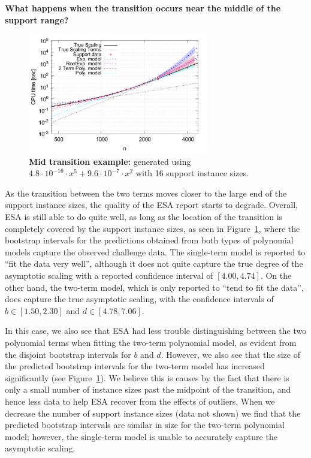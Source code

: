 \documentclass[aic]{iosart2x}
\begin{document}
\textbf{What happens when the transition occurs near the middle of the support range?}
\begin{figure}[t]
\centering
\includegraphics[width=0.7\textwidth]{fittedModels-2-5-15-16s.pdf}
\caption{\textbf{Mid transition example:} generated using $4.8\cdot 10^{-16} \cdot x^5 + 9.6\cdot 10^{-7} \cdot x^2$ with 16 support instance sizes.}
\label{fig:AA-competing-2-5-15-16s}
\end{figure}
As the transition between the two terms moves closer to the large end of the support instance sizes, the quality of the ESA report starts to degrade. Overall, ESA is still able to do quite well, as long as the location of the transition is completely covered by the support instance sizes, as seen in Figure~\ref{fig:AA-competing-2-5-15-16s}, where the bootstrap intervals for the predictions obtained from both types of polynomial models capture the observed challenge data. 
The single-term model is reported to ``fit the data very well'', although it does not quite capture the true degree of the asymptotic scaling with a reported confidence interval of $[4.00,4.74]$. 
On the other hand, the two-term model, which is only reported to ``tend to fit the data'', does capture the true asymptotic scaling, with the confidence intervals of $b \in [1.50,2.30]$ and $d \in [4.78,7.06]$. 

In this case, we also see that ESA had less trouble distinguishing between the two polynomial terms when fitting the two-term polynomial model, as evident from the disjoint bootstrap intervals for $b$ and $d$.
However, we also see that the size of the predicted bootstrap intervals for the two-term model has increased significantly (see Figure~\ref{fig:AA-competing-2-5-15-16s}). 
We believe this is causes by the fact that there is only a small number of instance sizes past the midpoint of the transition, and hence less data to help ESA recover from the effects of outliers. 
When we decrease the number of support instance sizes (data not shown) we find that the predicted bootstrap intervals are similar in size for the two-term polynomial model; however, the single-term model is unable to accurately capture the asymptotic scaling.
\end{document}
